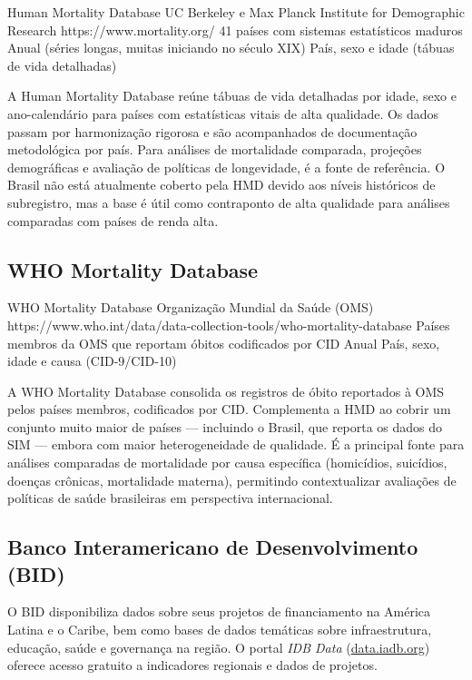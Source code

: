 \ficharapida
  {Human Mortality Database}
  {UC Berkeley e Max Planck Institute for Demographic Research}
  {https://www.mortality.org/}
  {41 países com sistemas estatísticos maduros}
  {Anual (séries longas, muitas iniciando no século XIX)}
  {País, sexo e idade (tábuas de vida detalhadas)}

A Human Mortality Database reúne tábuas de vida detalhadas por idade, sexo e ano-calendário para países com estatísticas vitais de alta qualidade. Os dados passam por harmonização rigorosa e são acompanhados de documentação metodológica por país. Para análises de mortalidade comparada, projeções demográficas e avaliação de políticas de longevidade, é a fonte de referência. O Brasil não está atualmente coberto pela HMD devido aos níveis históricos de subregistro, mas a base é útil como contraponto de alta qualidade para análises comparadas com países de renda alta.

\subsection{WHO Mortality Database}

\ficharapida
  {WHO Mortality Database}
  {Organização Mundial da Saúde (OMS)}
  {https://www.who.int/data/data-collection-tools/who-mortality-database}
  {Países membros da OMS que reportam óbitos codificados por CID}
  {Anual}
  {País, sexo, idade e causa (CID-9/CID-10)}

A WHO Mortality Database consolida os registros de óbito reportados à OMS pelos países membros, codificados por CID. Complementa a HMD ao cobrir um conjunto muito maior de países --- incluindo o Brasil, que reporta os dados do SIM --- embora com maior heterogeneidade de qualidade. É a principal fonte para análises comparadas de mortalidade por causa específica (homicídios, suicídios, doenças crônicas, mortalidade materna), permitindo contextualizar avaliações de políticas de saúde brasileiras em perspectiva internacional.

\subsection{Banco Interamericano de Desenvolvimento (BID)}

O BID disponibiliza dados sobre seus projetos de financiamento na América Latina e o Caribe, bem como bases de dados temáticas sobre infraestrutura, educação, saúde e governança na região. O portal \textit{IDB Data} (\url{data.iadb.org}) oferece acesso gratuito a indicadores regionais e dados de projetos.

